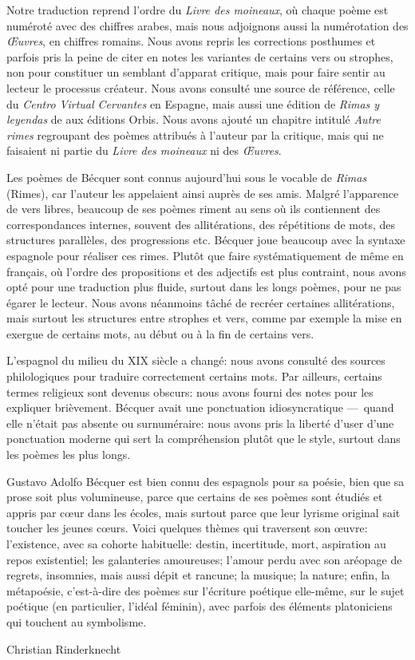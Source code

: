 
Notre traduction reprend l'ordre du \emph{Livre des moineaux}, où
chaque poème est numéroté avec des chiffres arabes, mais nous
adjoignons aussi la numérotation des \emph{Œuvres}, en chiffres
romains. Nous avons repris les corrections posthumes et parfois pris
la peine de citer en notes les variantes de certains vers ou strophes,
non pour constituer un semblant d'apparat critique, mais pour faire
sentir au lecteur le processus créateur. Nous avons consulté une
source de référence, celle du \emph{Centro Virtual Cervantes} en
Espagne, mais aussi une édition de \emph{Rimas y leyendas}
de  aux éditions Orbis. Nous avons ajouté un
chapitre intitulé \emph{Autre rimes} regroupant des poèmes attribués à
l'auteur par la critique, mais qui ne faisaient ni partie
du \emph{Livre des moineaux} ni des
\emph{Œuvres}.

Les poèmes de Bécquer sont connus aujourd'hui sous le vocable de
\emph{Rimas} (Rimes), car l'auteur les appelaient ainsi auprès de ses
amis. Malgré l'apparence de vers libres, beaucoup de ses poèmes riment
au sens où ils contiennent des correspondances internes, souvent des
allitérations, des répétitions de mots, des structures parallèles, des
progressions etc. Bécquer joue beaucoup avec la syntaxe espagnole pour
réaliser ces rimes. Plutôt que faire systématiquement de même en
français, où l'ordre des propositions et des adjectifs est plus
contraint, nous avons opté pour une traduction plus fluide, surtout
dans les longs poèmes, pour ne pas égarer le lecteur. Nous avons
néanmoins tâché de recréer certaines allitérations, mais surtout les
structures entre strophes et vers, comme par exemple la mise en
exergue de certains mots, au début ou à la fin de certains vers.

L'espagnol du milieu du XIX\ieme{} siècle a changé: nous avons
consulté des sources philologiques pour traduire correctement certains
mots. Par ailleurs, certains termes religieux sont devenus obscurs:
nous avons fourni des notes pour les expliquer brièvement. Bécquer
avait une ponctuation idiosyncratique ---~quand elle n'était pas
absente ou surnuméraire: nous avons pris la liberté d'user d'une
ponctuation moderne qui sert la compréhension plutôt que le style,
surtout dans les poèmes les plus longs.

Gustavo Adolfo Bécquer est bien connu des espagnols pour sa poésie,
bien que sa prose soit plus volumineuse, parce que certains de ses
poèmes sont étudiés et appris par cœur dans les écoles, mais surtout
parce que leur lyrisme original sait toucher les jeunes cœurs. Voici
quelques thèmes qui traversent son œuvre: l'existence, avec sa cohorte
habituelle: destin, incertitude, mort, aspiration au repos
existentiel; les galanteries amoureuses; l'amour perdu avec son
aréopage de regrets, insomnies, mais aussi dépit et rancune; la
musique; la nature; enfin, la métapoésie, c'est-à-dire des poèmes sur
l'écriture poétique elle-même, sur le sujet poétique (en particulier,
l'idéal féminin), avec parfois des éléments platoniciens qui touchent
au symbolisme.

\bigskip
\bigskip
\bigskip
\bigskip
\hfill Christian Rinderknecht
